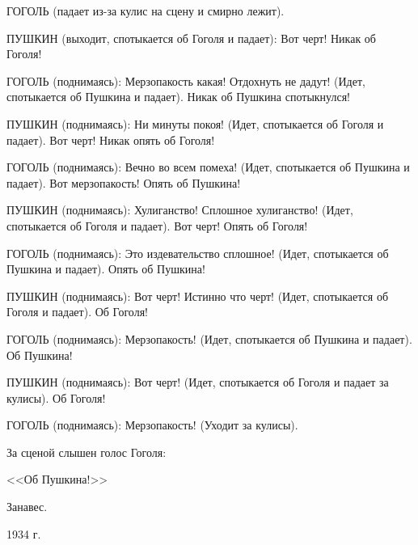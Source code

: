 ГОГОЛЬ  (падает из-за кулис на сцену и смирно лежит).

ПУШКИН (выходит, спотыкается об Гоголя и падает): Вот черт! Никак об Гоголя!

ГОГОЛЬ  (поднимаясь):  Мерзопакость какая! Отдохнуть не дадут! (Идет, спотыкается  об  Пушкина и падает).  Никак об Пушкина спотыкнулся!

ПУШКИН  (поднимаясь): Ни минуты покоя! (Идет, спотыкается об Гоголя и падает). Вот черт! Никак опять об Гоголя!

ГОГОЛЬ  (поднимаясь): Вечно во всем помеха! (Идет, спотыкается об  Пушкина и падает). Вот мерзопакость! Опять об Пушкина!

ПУШКИН  (поднимаясь):  Хулиганство! Сплошное хулиганство! (Идет,  спотыкается об Гоголя и падает). Вот черт! Опять об Гоголя!

ГОГОЛЬ  (поднимаясь): Это издевательство сплошное! (Идет, спотыкается об  Пушкина и падает). Опять об Пушкина!

ПУШКИН  (поднимаясь): Вот черт! Истинно что черт! (Идет, спотыкается об Гоголя и падает). Об Гоголя!

ГОГОЛЬ  (поднимаясь): Мерзопакость! (Идет, спотыкается об Пушкина и падает).  Об Пушкина!

ПУШКИН  (поднимаясь):   Вот   черт! (Идет, спотыкается об Гоголя и падает за кулисы). Об Гоголя!

ГОГОЛЬ  (поднимаясь): Мерзопакость! (Уходит за кулисы).

За сценой слышен голос Гоголя:

\begin{center} <<Об Пушкина!>> \end{center}
\begin{center} Занавес. \end{center}
\begin{flushright} 1934 г. \end{flushright}